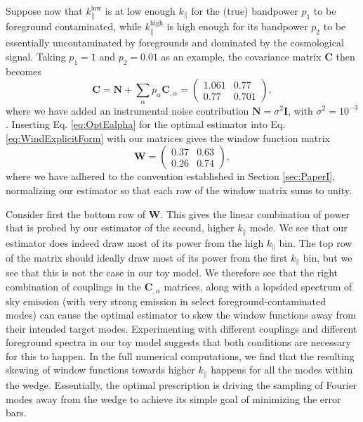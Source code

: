 \documentclass[twocolumn,aps,prd,nofootinbib,showpacs]{revtex4-1}
\begin{document}
Suppose now that $k_\parallel^{\textrm{low}}$ is at low enough $k_\parallel$ for the (true) bandpower $p_1$ to be foreground contaminated, while $k_\parallel^{\textrm{high}}$ is high enough for its bandpower $p_2$ to be essentially uncontaminated by foregrounds and dominated by the cosmological signal.  Taking $p_1 = 1$ and $p_2 = 0.01$ as an example, the covariance matrix $\mathbf{C}$ then becomes
\begin{equation}
\mathbf{C} =  \mathbf{N} + \sum_\alpha p_\alpha \mathbf{C}_{,\alpha} = \left( \begin{array}{cc}
1.061 & 0.77 \\
0.77 & 0.701
\end{array}
\right),
\end{equation}
where we have added an instrumental noise contribution $\mathbf{N} = \sigma^2 \mathbf{I}$, with $\sigma^2 = 10^{-3}$.  Inserting Eq. \eqref{eq:OptEalpha} for the optimal estimator into Eq. \eqref{eq:WindExplicitForm} with our matrices gives the window function matrix
\begin{equation}
\mathbf{W} =
\left( \begin{array}{cc}
0.37 & 0.63 \\
0.26 & 0.74
\end{array}
\right),
\end{equation}
where we have adhered to the convention established in Section \ref{sec:PaperI}, normalizing our estimator so that each row of the window matrix sums to unity.

Consider first the bottom row of $\mathbf{W}$.  This gives the linear combination of power that is probed by our estimator of the second, higher $k_\parallel$ mode.  We see that our estimator does indeed draw most of its power from the high $k_\parallel$ bin.  The top row of the matrix should ideally draw most of its power from the first $k_\parallel$ bin, but we see that this is not the case in our toy model.  We therefore see that the right combination of couplings in the $\mathbf{C}_{,\alpha}$ matrices, along with a lopsided spectrum of sky emission (with very strong emission in select foreground-contaminated modes) can cause the optimal estimator to skew the window functions away from their intended target modes.  Experimenting with different couplings and different foreground spectra in our toy model suggests that both conditions are necessary for this to happen.  In the full numerical computations, we find that the resulting skewing of window functions towards higher $k_\parallel$ happens for all the modes within the wedge.  Essentially, the optimal prescription is driving the sampling of Fourier modes away from the wedge to achieve its simple goal of minimizing the error bars.
\end{document}
